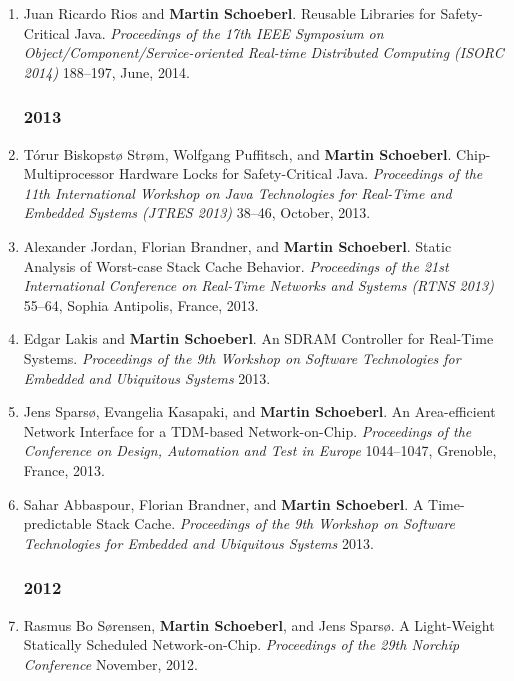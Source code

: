 \begin{enumerate}
\item Juan Ricardo Rios and {\bf Martin Schoeberl}.
 Reusable Libraries for Safety-Critical Java.
 \emph{Proceedings of the 17th IEEE Symposium on Object/Component/Service-oriented Real-time Distributed Computing (ISORC 2014)} 188--197, June, 2014.


\subsubsection*{2013}

\item T{\'o}rur Biskopst{\o} Str{\o}m, Wolfgang Puffitsch, and {\bf Martin Schoeberl}.
 Chip-Multiprocessor Hardware Locks for Safety-Critical Java.
 \emph{Proceedings of the 11th International Workshop on Java Technologies for Real-Time and Embedded Systems (JTRES 2013)} 38--46, October, 2013.

\item Alexander Jordan, Florian Brandner, and {\bf Martin Schoeberl}.
 Static Analysis of Worst-case Stack Cache Behavior.
 \emph{Proceedings of the 21st International Conference on Real-Time Networks and Systems (RTNS 2013)} 55--64, Sophia Antipolis, France, 2013.

\item Edgar Lakis and {\bf Martin Schoeberl}.
 An SDRAM Controller for Real-Time Systems.
 \emph{Proceedings of the 9th Workshop on Software Technologies for Embedded and Ubiquitous Systems} 2013.

\item Jens Spars{\o}, Evangelia Kasapaki, and {\bf Martin Schoeberl}.
 An Area-efficient Network Interface for a TDM-based Network-on-Chip.
 \emph{Proceedings of the Conference on Design, Automation and Test in Europe} 1044--1047, Grenoble, France, 2013.

\item Sahar Abbaspour, Florian Brandner, and {\bf Martin Schoeberl}.
 A Time-predictable Stack Cache.
 \emph{Proceedings of the 9th Workshop on Software Technologies for Embedded and Ubiquitous Systems} 2013.


\subsubsection*{2012}

\item Rasmus Bo S{\o}rensen, {\bf Martin Schoeberl}, and Jens Spars{\o}.
 A Light-Weight Statically Scheduled Network-on-Chip.
 \emph{Proceedings of the 29th Norchip Conference} November, 2012.


\end{enumerate}
